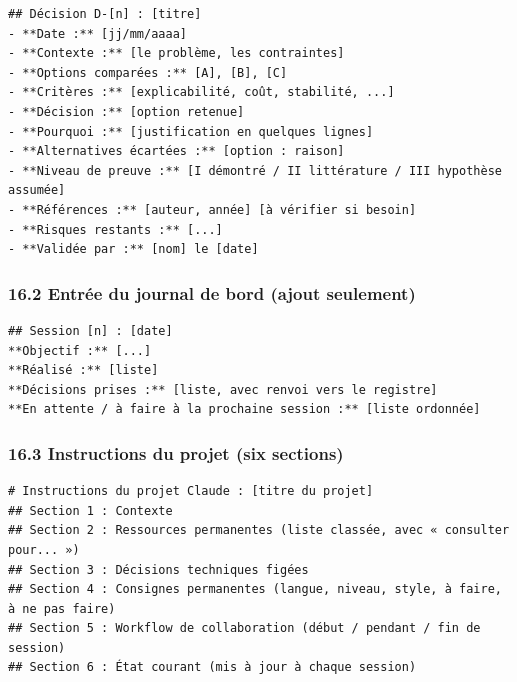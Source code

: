 \documentclass[
  french,
  11pt,
  a4paper,
]{article}
\begin{document}
\begin{Verbatim}[breaklines=true,breakanywhere=true,fontsize=\small,frame=leftline,framerule=1.6pt,rulecolor=\color{credixblue},framesep=3mm,xleftmargin=2mm,xrightmargin=1mm]
## Décision D-[n] : [titre]
- **Date :** [jj/mm/aaaa]
- **Contexte :** [le problème, les contraintes]
- **Options comparées :** [A], [B], [C]
- **Critères :** [explicabilité, coût, stabilité, ...]
- **Décision :** [option retenue]
- **Pourquoi :** [justification en quelques lignes]
- **Alternatives écartées :** [option : raison]
- **Niveau de preuve :** [I démontré / II littérature / III hypothèse assumée]
- **Références :** [auteur, année] [à vérifier si besoin]
- **Risques restants :** [...]
- **Validée par :** [nom] le [date]
\end{Verbatim}

\subsubsection{16.2 Entrée du journal de bord (ajout
seulement)}\label{162-entruxe9e-du-journal-de-bord-ajout-seulement}

\begin{Verbatim}[breaklines=true,breakanywhere=true,fontsize=\small,frame=leftline,framerule=1.6pt,rulecolor=\color{credixblue},framesep=3mm,xleftmargin=2mm,xrightmargin=1mm]
## Session [n] : [date]
**Objectif :** [...]
**Réalisé :** [liste]
**Décisions prises :** [liste, avec renvoi vers le registre]
**En attente / à faire à la prochaine session :** [liste ordonnée]
\end{Verbatim}

\subsubsection{16.3 Instructions du projet (six
sections)}\label{163-instructions-du-projet-six-sections}

\begin{Verbatim}[breaklines=true,breakanywhere=true,fontsize=\small,frame=leftline,framerule=1.6pt,rulecolor=\color{credixblue},framesep=3mm,xleftmargin=2mm,xrightmargin=1mm]
# Instructions du projet Claude : [titre du projet]
## Section 1 : Contexte
## Section 2 : Ressources permanentes (liste classée, avec « consulter pour... »)
## Section 3 : Décisions techniques figées
## Section 4 : Consignes permanentes (langue, niveau, style, à faire, à ne pas faire)
## Section 5 : Workflow de collaboration (début / pendant / fin de session)
## Section 6 : État courant (mis à jour à chaque session)
\end{Verbatim}
\end{document}
